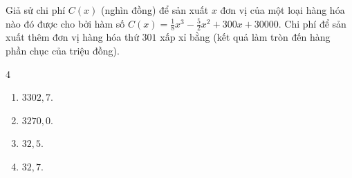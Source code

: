 \begin{baitap}
	Giả sử chi phí $C(x)$ (nghìn đồng) để sản xuất $x$ đơn vị của một loại hàng hóa nào đó được cho bởi hàm số $C(x) = \frac{1}{8}x^3 - \frac{5}{2}x^2 + 300x + 30000$. Chi phí để sản xuất thêm đơn vị hàng hóa thứ $301$ xấp xỉ bằng (kết quả làm tròn đến hàng phần chục của triệu đồng).
	\begin{multicols}{4}
		\begin{enumerate}
			\item $3302{,}7$.
			\item $3270{,}0$.
			\item $32{,}5$.
			\item $32{,}7$.
		\end{enumerate}
	\end{multicols}
\end{baitap}
